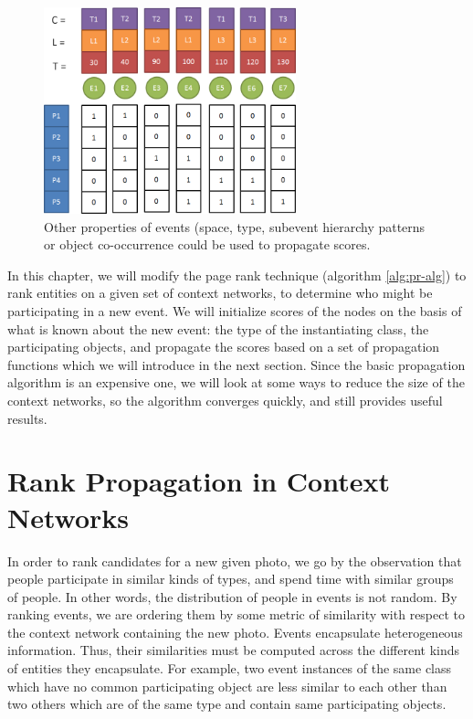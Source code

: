 \begin{figure}[h]
\centering
\includegraphics[width=0.65\textwidth]{media/chapter6/multi-property-example.png}
\caption{Other properties of events (space, type, subevent hierarchy patterns or object co-occurrence could be used to propagate scores.}
\label{fig:location-example}
\end{figure}

In this chapter, we will modify the page rank technique (algorithm \ref{alg:pr-alg}) to rank entities on a given set of context networks, to determine who might be participating in a new event. We will initialize scores of the nodes on the basis of what is known about the new event: the type of the instantiating class, the participating objects, and propagate the scores based on a set of propagation functions which we will introduce in the next section. Since the basic propagation algorithm is an expensive one, we will look at some ways to reduce the size of the context networks, so the algorithm converges quickly, and still provides useful results.

\section{Rank Propagation in Context Networks}

In order to rank candidates for a new given photo, we go by the observation that people participate in similar kinds of types, and spend time with similar groups of people. In other words, the distribution of people in events is not random. By ranking events, we are ordering them by some metric of similarity with respect to the context network containing the new photo. Events encapsulate heterogeneous information. Thus, their similarities must be computed across the different kinds of entities they encapsulate. For example, two event instances of the same class which have no common participating object are less similar to each other than two others which are of the same type and contain same participating objects.

